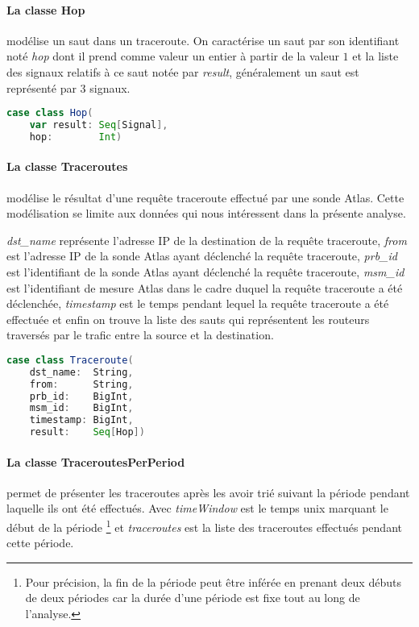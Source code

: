 \paragraph{La classe Hop} modélise un saut dans un traceroute. On caractérise un saut par son identifiant noté \textit{hop} dont il prend comme valeur un entier à partir de la valeur $1$ et la liste des signaux relatifs à ce saut notée par \textit{result}, généralement un saut est représenté par $3$ signaux.
\begin{lstlisting}[language=scala]
case class Hop(
	var result: Seq[Signal],
	hop:        Int)
\end{lstlisting}
\paragraph{La classe Traceroutes} modélise le résultat d'une requête traceroute effectué par une sonde Atlas. Cette modélisation se limite aux données qui nous intéressent dans la présente analyse. 

\textit{dst\_name} représente l'adresse IP de la destination de la requête traceroute, \textit{from} est l'adresse IP de la sonde Atlas ayant déclenché la requête traceroute, \textit{prb\_id} est l'identifiant de la sonde Atlas ayant déclenché la requête traceroute, \textit{msm\_id} est l'identifiant de mesure Atlas dans le cadre duquel la requête traceroute a été déclenchée, \textit{timestamp} est le temps pendant lequel la requête traceroute a été effectuée et enfin on trouve la liste des sauts qui représentent les routeurs traversés par le trafic entre la source et la destination. 

 \begin{lstlisting}[language=scala]
case class Traceroute(
	dst_name:  String,
	from:      String,
	prb_id:    BigInt,
	msm_id:    BigInt,
	timestamp: BigInt,
	result:    Seq[Hop])
 \end{lstlisting}
\paragraph{La classe TraceroutesPerPeriod} permet de présenter les traceroutes après les avoir trié   suivant la période pendant laquelle ils ont été effectués.  Avec \textit{timeWindow} est le temps unix marquant le début de la période \footnote{Pour précision, la fin de la période peut être inférée en prenant deux débuts de deux périodes car la durée d'une période est fixe tout au long de l'analyse.} et  \textit{traceroutes} est la liste des traceroutes effectués pendant cette période. 


